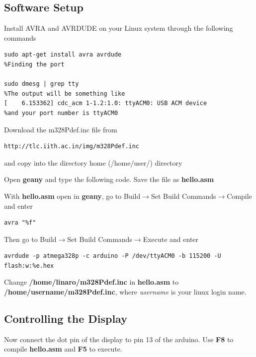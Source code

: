 \subsection{Software Setup}
\begin{problem}
Install AVRA and AVRDUDE on your Linux system through the following commands
\begin{lstlisting}
sudo apt-get install avra avrdude
%Finding the port

sudo dmesg | grep tty
%The output will be something like
[    6.153362] cdc_acm 1-1.2:1.0: ttyACM0: USB ACM device
%and your port number is ttyACM0
\end{lstlisting}
\end{problem}
\begin{problem}
Download the m328Pdef.inc file from 
\begin{lstlisting}
http://tlc.iith.ac.in/img/m328Pdef.inc
\end{lstlisting}
%
and copy into the directory home (/home/user/) directory
\end{problem}
%
\begin{problem}
Open \textbf{geany} and type the following code.  Save the file as \textbf{hello.asm}
\end{problem}

\begin{problem}
With \textbf{hello.asm} open in \textbf{geany}, go to Build$\rightarrow$Set Build Commands$\rightarrow$Compile and enter 
\begin{lstlisting}
avra "%f"
\end{lstlisting}
%
Then  go to Build$\rightarrow$Set Build Commands$\rightarrow$Execute and enter
\begin{lstlisting}
avrdude -p atmega328p -c arduino -P /dev/ttyACM0 -b 115200 -U flash:w:%e.hex
\end{lstlisting}
\end{problem}
%
\begin{problem}
Change \textbf{/home/linaro/m328Pdef.inc} in \textbf{hello.asm} to \textbf{/home/username/m328Pdef.inc}, where
{\em username} is your linux login name.
\end{problem}
\subsection{Controlling the Display}
\begin{problem}
Now connect the dot pin of the display to pin 13 of the arduino.  Use \textbf{F8} to compile \textbf{hello.asm}
and \textbf{F5} to execute.
\end{problem}

